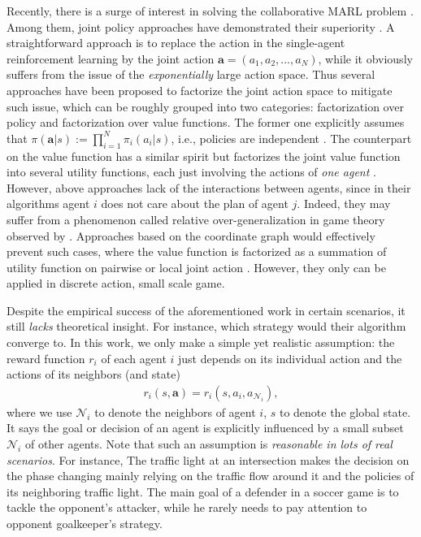 \documentclass[11pt,a4paper]{article}
\theoremstyle{definition}
\begin{document}
Recently, there is a surge of interest in solving the collaborative MARL problem \citep{foerster2018counterfactual,qu2019value,lowe2017multi}. Among them, joint policy approaches have demonstrated their superiority \citep{rashid2018qmix,sunehag2018value,oliehoek2016concise}.  A straightforward approach is to replace the action in the single-agent reinforcement learning by the joint action $\mathbf{a}=(a_1,a_2,...,a_N)$, while it obviously suffers from the issue of the \emph{exponentially} large action space. Thus several approaches have been proposed to factorize the joint action space to mitigate such issue, which can be roughly grouped into two categories: factorization over policy and factorization over value functions. The former one explicitly assumes that  $\pi(\mathbf{a}|s):=\prod_{i=1}^{N} \pi_i(a_i|s)$, i.e., policies are independent \citep{foerster2018counterfactual,zhang2018fully}.  The counterpart on the value function has a similar spirit but factorizes the joint value function into several utility functions, each just involving the actions of \emph{one agent} \citep{rashid2018qmix,sunehag2018value}.  However, above approaches lack of the interactions between agents, since in their algorithms agent $i$ does not care about the plan of agent $j$.  Indeed, they may suffer from a phenomenon called relative over-generalization in game theory observed by \citet{wei2016lenient,castellini2019representational,palmer2018lenient}. Approaches based on the coordinate graph would effectively prevent such cases, where the value function is factorized as a summation of utility function on pairwise or local joint action \citep{guestrin2002coordinated,bohmer2019deep}. However, they only can be applied in discrete action, small scale game.

Despite the empirical success of the aforementioned work in certain scenarios, it still \emph{lacks} theoretical insight. For instance, which strategy would their algorithm converge to. In this work, we only make a simple yet realistic assumption: the reward function $r_i$ of each agent $i$ just depends on its individual action and the actions of its neighbors (and  state)
\begin{align}
r_i(s,\mathbf{a})=r_i(s,a_i,a_{\mathcal{N}_i}),   
\label{eq:assumption}
\end{align}
where we use $\mathcal{N}_i$ to denote the neighbors of agent $i$, $s$ to denote the global state.
It says the goal or decision of an agent is explicitly influenced by a small subset $\mathcal{N}_i$ of other agents. Note that such an assumption is \emph{reasonable in lots of real scenarios}. For instance, The traffic light at an intersection makes the decision on the phase changing mainly relying on the traffic flow around it and the policies of its neighboring traffic light. 
The main goal of a defender in a soccer game is to tackle the opponent's attacker, while he rarely needs to pay attention to opponent goalkeeper's strategy.  
\end{document}
